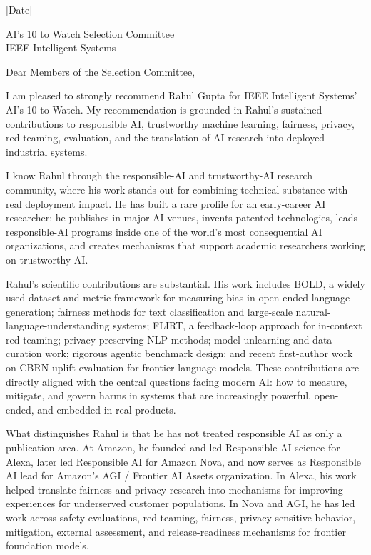 \documentclass[11pt]{article}
\begin{document}
[Date]

AI's 10 to Watch Selection Committee\\
IEEE Intelligent Systems

Dear Members of the Selection Committee,

I am pleased to strongly recommend Rahul Gupta for IEEE Intelligent Systems' AI's 10 to Watch. My recommendation is grounded in Rahul's sustained contributions to responsible AI, trustworthy machine learning, fairness, privacy, red-teaming, evaluation, and the translation of AI research into deployed industrial systems.

I know Rahul through the responsible-AI and trustworthy-AI research community, where his work stands out for combining technical substance with real deployment impact. He has built a rare profile for an early-career AI researcher: he publishes in major AI venues, invents patented technologies, leads responsible-AI programs inside one of the world's most consequential AI organizations, and creates mechanisms that support academic researchers working on trustworthy AI.

Rahul's scientific contributions are substantial. His work includes BOLD, a widely used dataset and metric framework for measuring bias in open-ended language generation; fairness methods for text classification and large-scale natural-language-understanding systems; FLIRT, a feedback-loop approach for in-context red teaming; privacy-preserving NLP methods; model-unlearning and data-curation work; rigorous agentic benchmark design; and recent first-author work on CBRN uplift evaluation for frontier language models. These contributions are directly aligned with the central questions facing modern AI: how to measure, mitigate, and govern harms in systems that are increasingly powerful, open-ended, and embedded in real products.

What distinguishes Rahul is that he has not treated responsible AI as only a publication area. At Amazon, he founded and led Responsible AI science for Alexa, later led Responsible AI for Amazon Nova, and now serves as Responsible AI lead for Amazon's AGI / Frontier AI Assets organization. In Alexa, his work helped translate fairness and privacy research into mechanisms for improving experiences for underserved customer populations. In Nova and AGI, he has led work across safety evaluations, red-teaming, fairness, privacy-sensitive behavior, mitigation, external assessment, and release-readiness mechanisms for frontier foundation models.
\end{document}

